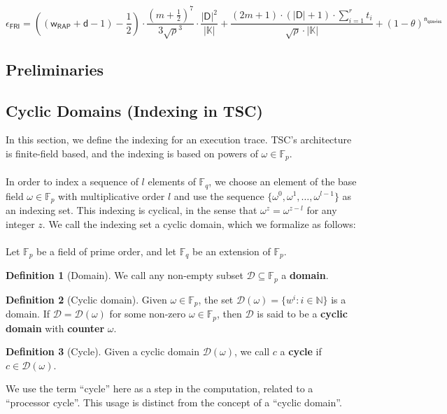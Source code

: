 \documentclass[10pt,letterpaper,titlepage]{article}
\newcommand{\GF}[1]{\mathbb{F}_{#1}}
\newcommand{\w}[0]{\omega}
\newcommand{\D}[0]{\mathcal{D}}
\theoremstyle{definition}
\newtheorem{definition}{Definition}
\begin{document}
\[ 
    \epsilon_\mathsf{FRI} =
    ((\mathsf{w_{RAP}}+\mathsf{d}-1)-\frac{1}{2})\cdot\frac{(m+\frac{1}{2})^7}{3\sqrt{\rho}^3}\cdot\frac{|\mathsf{D}|^2}{|\mathbb{K}|} 
    + 
    \frac{(2m+1)\cdot(|\mathsf{D}|+1)\cdot\sum^r_{i=1}t_i}{\sqrt{\rho}\cdot|\mathbb{K}|}
    +
    (1-\theta)^\mathsf{n_{queries}}
  \]
\pagebreak
\printbibliography
\pagebreak
\begin{appendices}
\section{Preliminaries}
\label{preliminaries}
\subsection{Cyclic Domains (Indexing in TSC)}
\label{sequential time}
\label{cyclic domains}
In this section, we define the indexing for an execution trace. TSC's architecture is finite-field based, and the indexing is based on powers of $\w\in\GF{p}$. \\
\\
In order to index a sequence of $l$ elements of $\GF{q}$, we choose an element of the base field $\w\in\GF{p}$ with multiplicative order $l$ and use the sequence $\{\w^0, \w^1, \ldots, \w^{l-1}\}$ as an indexing set. 
This indexing is cyclical, in the sense that $\w^z=\w^{z-l}$ for any integer $z$. 
We call the indexing set a cyclic domain, which we formalize as follows: \\
\\
Let $\GF{p}$ be a field of prime order, and let $\GF{q}$ be an extension of $\GF{p}$.
\begin{definition}[Domain] 
  We call any non-empty subset $\D\subseteq\GF{p}$ a \textbf{domain}.
\end{definition}
\begin{definition}[Cyclic domain] 
  Given $\w\in\GF{p}$, the set $\D(\omega)=\{w^i:i\in\mathbb{N}\}$ is a domain. 
  If $\D=\D(\w)$ for some non-zero $\w\in\GF{p}$, then $\D$ is said to be a \textbf{cyclic domain} with \textbf{counter} $\w$. 
\end{definition}
\begin{definition}[Cycle]
  Given a cyclic domain $\D(\w)$, we call $c$ a \textbf{cycle} if $c\in\D(\omega)$. 
\end{definition}
\noindent 
We use the term ``cycle'' here as a step in the computation, related to a ``processor cycle''.
This usage is distinct from the concept of a ``cyclic domain''.\\

\end{appendices}
\end{document}
